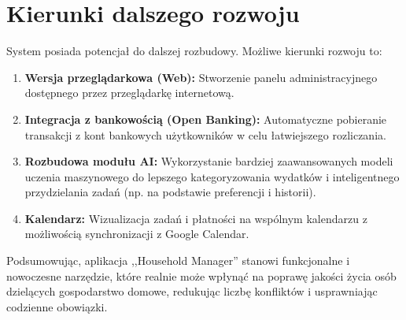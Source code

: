 \section{Kierunki dalszego rozwoju}

System posiada potencjał do dalszej rozbudowy. Możliwe kierunki rozwoju to:
\begin{enumerate}
    \item \textbf{Wersja przeglądarkowa (Web):} Stworzenie panelu administracyjnego dostępnego przez przeglądarkę internetową.
    \item \textbf{Integracja z bankowością (Open Banking):} Automatyczne pobieranie transakcji z kont bankowych użytkowników w celu łatwiejszego rozliczania.
    \item \textbf{Rozbudowa modułu AI:} Wykorzystanie bardziej zaawansowanych modeli uczenia maszynowego do lepszego kategoryzowania wydatków i inteligentnego przydzielania zadań (np. na podstawie preferencji i historii).
    \item \textbf{Kalendarz:} Wizualizacja zadań i płatności na wspólnym kalendarzu z możliwością synchronizacji z Google Calendar.
\end{enumerate}

Podsumowując, aplikacja ,,Household Manager'' stanowi funkcjonalne i nowoczesne narzędzie, które realnie może wpłynąć na poprawę jakości życia osób dzielących gospodarstwo domowe, redukując liczbę konfliktów i usprawniając codzienne obowiązki.

